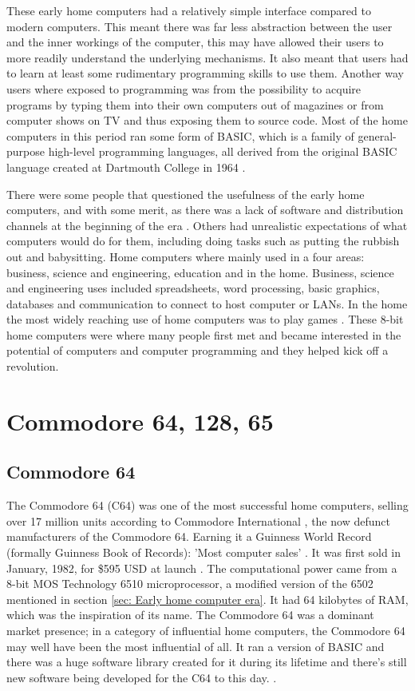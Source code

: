 These early home computers had a relatively simple interface compared to modern computers. This meant there was far less abstraction between the user and the inner workings of the computer, this may have allowed their users to more readily understand the underlying mechanisms. It also meant that users had to learn at least some rudimentary programming skills to use them. Another way users where exposed to programming was from the possibility to acquire programs by typing them into their own computers out of magazines or from computer shows on TV and thus exposing them to source code. Most of the home computers in this period ran some form of BASIC, which is a family of general-purpose high-level programming languages, all derived from the original BASIC language created at Dartmouth College in 1964
\cite{RN130}. 

There were some people that questioned the usefulness of the early home computers, and with some merit, as there was a lack of software and distribution channels at the beginning of the era
\cite{RN23}. Others had unrealistic expectations of what computers would do for them, including doing tasks such as putting the rubbish out and babysitting. Home computers where mainly used in a four areas: business, science and engineering, education and in the home. Business, science and engineering uses included spreadsheets, word processing, basic graphics, databases and communication to connect to host computer or LANs. In the home the most widely reaching use of home computers was to play games 
\cite{RN24}. These 8-bit home computers were where many people first met and became interested in the potential of computers and computer programming and they helped kick off a revolution.


\section{Commodore 64, 128, 65}
\subsection{Commodore 64}
The Commodore 64 (C64) was one of the most successful home computers, selling over 17 million units according to Commodore International 
\cite{RN42}, the now defunct manufacturers of the Commodore 64. Earning it a Guinness World Record (formally Guinness Book of Records): 'Most computer sales'
\cite{RN43}.
It was first sold in January, 1982, for \$595 USD at launch 
\cite{RN28}. The computational power came from a 8-bit MOS Technology 6510 microprocessor, a modified version of the 6502 mentioned in section \ref{sec: Early home computer era}. It had 64 kilobytes of RAM, which was the inspiration of its name. The Commodore 64 was a dominant market presence; in a category of influential home computers, the Commodore 64 may well have been the most influential of all. It ran a version of BASIC and there was a huge software library created for it during its lifetime and there's still new software being developed for the C64 to this day.
\cite{RN82}\cite{RN83}\cite{RN84}.

